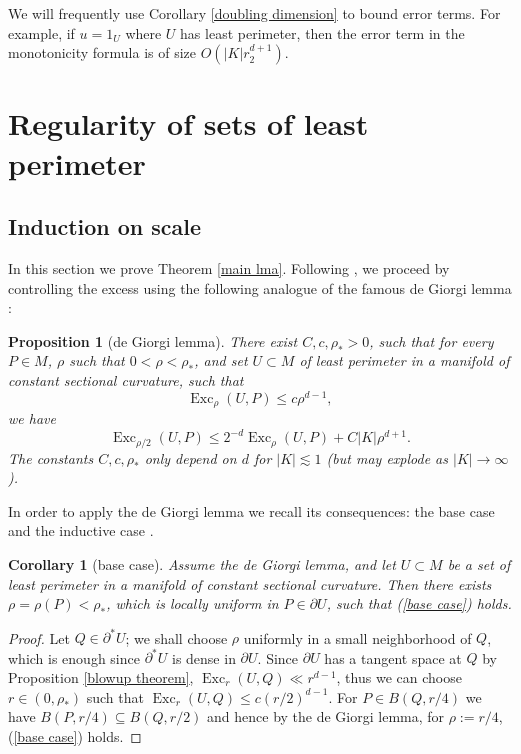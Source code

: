 \documentclass[reqno,11pt]{amsart}
\DeclareMathOperator{\Exc}{Exc}
\newtheorem{proposition}[theorem]{Proposition}
\newtheorem{corollary}[theorem]{Corollary}
\theoremstyle{definition}
\numberwithin{equation}{section}
\begin{document}
We will frequently use Corollary \ref{doubling dimension} to bound error terms.
For example, if $u = 1_U$ where $U$ has least perimeter, then the error term in the monotonicity formula is of size $O(|K|r_2^{d + 1})$.



\section{Regularity of sets of least perimeter}\label{Plateau section}
\subsection{Induction on scale}
In this section we prove Theorem \ref{main lma}.
Following \cite{Miranda66,Giusti77,deGiorgi61}, we proceed by controlling the excess using the following analogue of the famous de Giorgi lemma \cite[Theorem 8.1]{Giusti77}:

\begin{proposition}[de Giorgi lemma]\label{de Giorgi}
There exist $C, c, \rho_* > 0$, such that for every $P \in M$, $\rho$ such that $0 < \rho < \rho_*$, and set $U \subset M$ of least perimeter in a manifold of constant sectional curvature, such that
\begin{equation}\label{base case}
\Exc_\rho(U, P) \leq c\rho^{d - 1},
\end{equation}
we have
\begin{equation}\label{dGL concl}
\Exc_{\rho/2}(U, P) \leq 2^{-d} \Exc_\rho(U, P) + C|K|\rho^{d + 1}.
\end{equation}
The constants $C, c, \rho_*$ only depend on $d$ for $|K| \lesssim 1$ (but may explode as $|K| \to \infty$).
\end{proposition}

In order to apply the de Giorgi lemma we recall its consequences: the base case \cite[pg109]{Giusti77} and the inductive case \cite[Corollary 8.3]{Giusti77}.

\begin{corollary}[base case]
Assume the de Giorgi lemma, and let $U \subset M$ be a set of least perimeter in a manifold of constant sectional curvature.
Then there exists $\rho  = \rho(P) < \rho_*$, which is locally uniform in $P \in \partial U$, such that (\ref{base case}) holds.
\end{corollary}
\begin{proof}
Let $Q \in \partial^* U$; we shall choose $\rho$ uniformly in a small neighborhood of $Q$, which is enough since $\partial^* U$ is dense in $\partial U$.
Since $\partial U$ has a tangent space at $Q$ by Proposition \ref{blowup theorem}, $\Exc_r(U, Q) \ll r^{d - 1}$, thus we can choose $r \in (0, \rho_*)$ such that $\Exc_r(U, Q) \leq c(r/2)^{d - 1}$.
For $P \in B(Q, r/4)$ we have $B(P, r/4) \subseteq B(Q, r/2)$ and hence by the de Giorgi lemma, for $\rho := r/4$, (\ref{base case}) holds.
\end{proof}
\end{document}
